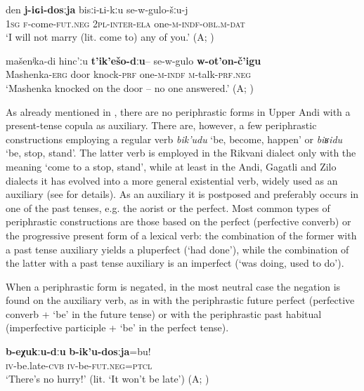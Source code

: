 \documentclass[output=paper,colorlinks=true, citecolor=brown]{langscibook}
\begin{document}
\ea 
    \label{ex:and:6} 
    \gll den \textbf{j{}-iɢi{}-dosːja} bisːi{}-ʟi{}-kːu se{}-w{}-gulo{}-šːu{}-j\\
          \textsc{1sg} \textsc{f}{}-come-\textsc{fut.neg} \textsc{2pl{}-inter-ela} one-\textsc{m-indf-obl.m-dat}\\
    \glt ‘I will not marry (lit. come to) any of you.’ (A; )
\z 

\ea
    \label{ex:and:7}
    \gll mašenʲka{}-di hinc’ːu \textbf{t’ik’ešo{}-dːu}– se{}-w{}-gulo \textbf{w{}-ot’on{}-č’igu}\\
          Mashenka-\textsc{erg} door knock-\textsc{prf} one-\textsc{m-indf} \textsc{m}{}-talk-\textsc{prf.neg}\\
    \glt ‘Mashenka knocked on the door – no one answered.’ (A; )
\z 

As already mentioned in , there are no periphrastic forms in Upper Andi with a present-tense copula as auxiliary. There are, however, a few periphrastic constructions employing a regular verb \textit{bik’udu} ‘be, become, happen’ or \textit{biʁidu} ‘be, stop, stand’. The latter verb is employed in the Rikvani dialect only with the meaning ‘come to a stop, stand’, while at least in the Andi, Gagatli and Zilo dialects it has evolved into a more general existential verb, widely used as an auxiliary (see \citealt{VerheesRochant2017} for details). As an auxiliary it is postposed and preferably occurs in one of the past tenses, e.g. the aorist or the perfect. Most common types of periphrastic constructions are those based on the perfect (perfective converb) or the progressive present form of a lexical verb: the combination of the former with a past tense auxiliary yields a pluperfect (‘had done’), while the combination of the latter with a past tense auxiliary is an imperfect (‘was doing, used to do’).

When a periphrastic form is negated, in the most neutral case the negation is found on the auxiliary verb, as in  with the periphrastic future perfect (perfective converb + ‘be’ in the future tense) or  with the periphrastic past habitual (imperfective participle + ‘be’ in the perfect tense). 

\ea
    \label{ex:and:8}
    \gll  \textbf{b{}-eχukːu{}-dːu} \textbf{b{}-ik’u{}-dosːja}=bu!\\
          \textsc{iv}{}-be.late-\textsc{cvb} \textsc{iv}{}-be-\textsc{fut.neg=ptcl}\\
    \glt ‘There’s no hurry!’ (lit. ‘It won’t be late') (A; )
\z 
\end{document}
